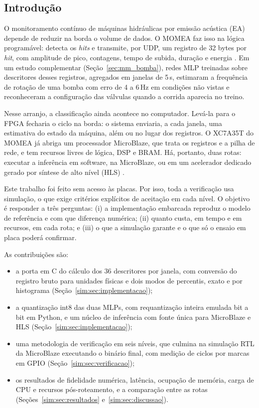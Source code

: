 \subsection{Introdução}
\label{sim:sec:introducao}

O monitoramento contínuo de máquinas hidráulicas por emissão acústica (EA) depende de reduzir na borda o volume de dados. O MOMEA faz isso na lógica programável: detecta os \textit{hits} e transmite, por UDP, um registro de 32 bytes por \textit{hit}, com amplitude de pico, contagens, tempo de subida, duração e energia \cite{unnthorsson2013,vallen2022}. Em um estudo complementar (Seção~\ref{sec:mm_bomba}), redes MLP treinadas sobre descritores desses registros, agregados em janelas de 5\,s, estimaram a frequência de rotação de uma bomba com erro de 4 a 6\,Hz em condições não vistas e reconheceram a configuração das válvulas quando a corrida aparecia no treino.

Nesse arranjo, a classificação ainda acontece no computador. Levá-la para o FPGA fecharia o ciclo na borda: o sistema enviaria, a cada janela, uma estimativa do estado da máquina, além ou no lugar dos registros. O XC7A35T do MOMEA já abriga um processador MicroBlaze, que trata os registros e a pilha de rede, e tem recursos livres de lógica, DSP e BRAM. Há, portanto, duas rotas: executar a inferência em software, na MicroBlaze, ou em um acelerador dedicado gerado por síntese de alto nível (HLS) \cite{amd_ug1399,duarte2018}.

Este trabalho foi feito sem acesso às placas. Por isso, toda a verificação usa simulação, o que exige critérios explícitos de aceitação em cada nível. O objetivo é responder a três perguntas: (i) a implementação embarcada reproduz o modelo de referência e com que diferença numérica; (ii) quanto custa, em tempo e em recursos, em cada rota; e (iii) o que a simulação garante e o que só o ensaio em placa poderá confirmar.

As contribuições são:
\begin{itemize}
	\item a porta em C do cálculo dos 36 descritores por janela, com conversão do registro bruto para unidades físicas e dois modos de percentis, exato e por histograma (Seção~\ref{sim:sec:implementacao});
	\item a quantização int8 das duas MLPs, com requantização inteira emulada bit a bit em Python, e um núcleo de inferência com fonte única para MicroBlaze e HLS (Seção~\ref{sim:sec:implementacao});
	\item uma metodologia de verificação em seis níveis, que culmina na simulação RTL da MicroBlaze executando o binário final, com medição de ciclos por marcas em GPIO (Seção~\ref{sim:sec:verificacao});
	\item os resultados de fidelidade numérica, latência, ocupação de memória, carga de CPU e recursos pós-roteamento, e a comparação entre as rotas (Seções~\ref{sim:sec:resultados} e~\ref{sim:sec:discussao}).
\end{itemize}

